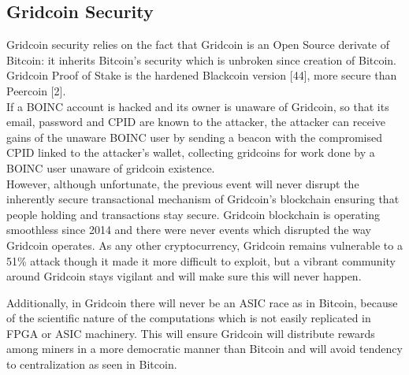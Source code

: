 \subsection{Gridcoin Security}

Gridcoin security relies on the fact that Gridcoin is an Open Source derivate of Bitcoin: it inherits Bitcoin's security which is unbroken since creation of Bitcoin. Gridcoin Proof of Stake is the hardened Blackcoin version [44], more secure than Peercoin [2].\\ 

If a BOINC account is hacked and its owner is unaware of Gridcoin, so that its email, password and CPID are known to the attacker, the attacker can receive gains of the unaware BOINC user by sending a beacon with the compromised CPID linked to the attacker's wallet, collecting gridcoins for work done by a BOINC user unaware of gridcoin existence.\\

However, although unfortunate, the previous event will never disrupt the inherently secure transactional mechanism of Gridcoin's blockchain ensuring that people holding and transactions stay secure. Gridcoin blockchain is operating smoothless since 2014 and there were never events which disrupted the way Gridcoin operates. As any other cryptocurrency, Gridcoin remains vulnerable to a 51\% attack though it made it more difficult to exploit, but a vibrant community around Gridcoin stays vigilant and will make sure this will never happen.

Additionally, in Gridcoin there will never be an ASIC race as in Bitcoin, because of the scientific nature of the computations which is not easily replicated in FPGA or ASIC machinery. This will ensure Gridcoin will distribute rewards among miners in a more democratic manner than Bitcoin and will avoid tendency to centralization as seen in Bitcoin.